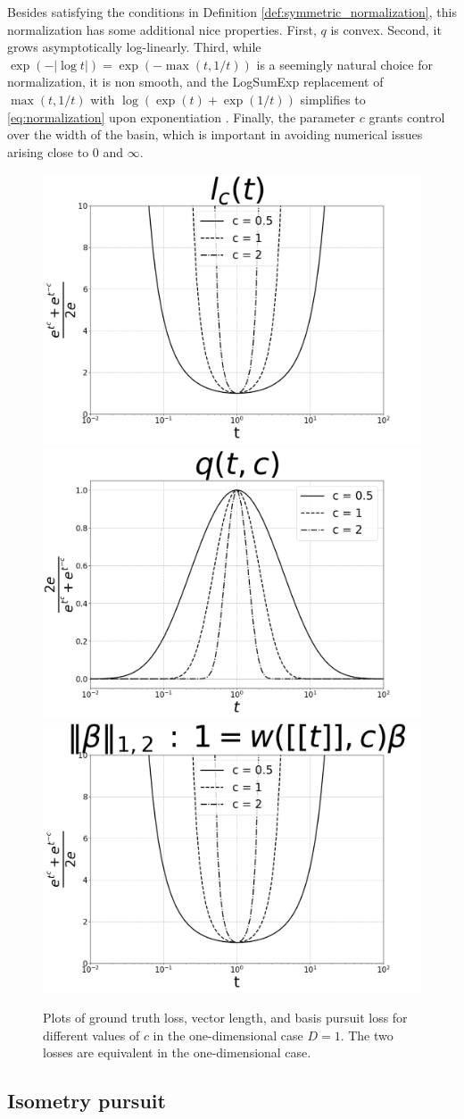 Besides satisfying the conditions in Definition \ref{def:symmetric_normalization}, this normalization has some additional nice properties.
First, $q$ is convex.
Second, it grows asymptotically log-linearly.
Third, while $\exp(-|\log t|) = \exp(-\max (t, 1/t))$ is a seemingly natural choice for normalization, it is non smooth, and the LogSumExp replacement of $\max (t, 1/t)$ with $ \log (\exp (t ) + \exp(1/t))$ simplifies to \ref{eq:normalization} upon exponentiation \citep{Boyd2004-ql}.
Finally, the parameter $c$ grants control over the width of the basin, which is important in avoiding numerical issues arising close to $0$ and $\infty$.

\begin{figure}
\centering
{}
{\includegraphics[width = .32\textwidth]{../figures/Figure_1a_bw.png}}
\label{fig:gt_loss}
{\includegraphics[width = .32\textwidth]{../figures/Figure_1b_bw.png}}
{\includegraphics[width = .32\textwidth]{../figures/Figure_1c_bw.png}}
\caption{Plots of ground truth loss, vector length, and basis pursuit loss for different values of $c$ in the one-dimensional case $D = 1$.
The two losses are equivalent in the one-dimensional case.}
\end{figure}

\subsection{Isometry pursuit}

